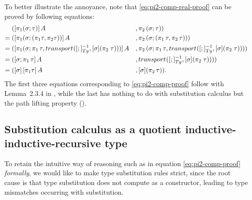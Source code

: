 \documentclass[a4paper,UKenglish,numberwithinsect,cleveref,thm-restate]{lipics-v2021}
\begin{document}
\begin{example}
  To better illustrate the annoyance, note that \eqref{eq:pi2-comp-real-proof} can be proved by following equations:
  \begin{alignat*}{3}
         & ([\pi_1(\sigma; \tau)]\,A                    &&, \pi_2\,(\sigma ; \tau)) \\
    = {} & ([\pi_1(\sigma; (\pi_1\tau , \pi_2\tau))]\,A &&, \pi_2\,(\sigma; (\pi_1\,\tau, \pi_2\,\tau))) \\
    = {} & ([\pi_1(\sigma;\pi_1\,\tau, \transfib{}{[;]_{\Ty}^{-1}}{\color{black}[ \sigma ] (\pi_2\;\tau)})]\,A &&, \pi_2\,(\sigma;\pi_1\,\tau, \transfib{}{[;]_{\Ty}^{-1}}{\color{black}[ \sigma ] (\pi_2\;\tau)})) \\
    = {} & ([\sigma;\pi_1\,\tau]\,A &&, \transfib{}{[;]_{\Ty}^{-1}}{\color{black}[ \sigma ] (\pi_2\;\tau)})) \nonumber \\
    = {} & (\sub{\sigma}{\sub{\pi_1\tau}{A}} &&, [\sigma] (\pi_2\,\tau)). \nonumber
  \end{alignat*}
  The first three equations corresponding to \eqref{eq:pi2-comp-proof} follow with Lemma~2.3.4 in \cite{UFP2013}, while the last has nothing to do with substitution calculus but the path lifting property (\cite[Lemma~2.3.2]{UFP2013}).
\end{example}

\subsection{Substitution calculus as a quotient inductive-inductive-recursive type} \label{subsec:SC-QIIRT}

To retain the intuitive way of reasoning such as in equation \eqref{eq:pi2-comp-proof} \emph{formally}, we would like to make type substitution rules strict, since the root cause is that type substitution does not compute as a constructor, leading to type mismatches occurring with substitution.
\end{document}
